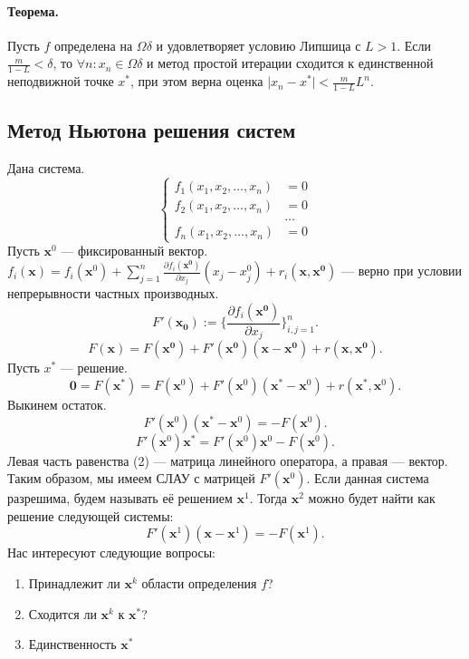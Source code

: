 \paragraph{Теорема.} Пусть $f$ определена на $\Omega\delta$ и удовлетворяет условию Липшица с $L > 1$. Если $\frac{m}{1-L} < \delta$, то $\forall n: x_n \in \Omega \delta$ и метод простой итерации сходится к единственной неподвижной точке $x^*$, при этом верна оценка $\vert x_n - x^*\vert < \frac {m}{1-L}L^n$.
\subsection{Метод Ньютона решения систем}
Дана система.
\[
	\left\{
	\begin{aligned}
		f_1(x_1, x_2, \dots, x_{n}) & = 0    \\
		f_2(x_1, x_2, \dots, x_{n}) & = 0    \\
		                            & \hdots \\
		f_n(x_1, x_2, \dots, x_{n}) & = 0    
	\end{aligned}
	\right.
\]
Пусть $\mathbf{x}^0$ --- фиксированный вектор. $f_i(\mathbf{x}) = f_i(\mathbf{x}^0) + \sum\limits_{j = 1}^{n} \frac{\partial f_i(\mathbf{x^0})}{\partial x_j}(x_j-x^0_j) + r_i(\mathbf{x}, \mathbf{x^0})$ --- верно при условии непрерывности частных производных.
\[
	F'(\mathbf{x_0}) := \{\frac{\partial f_i(\mathbf{x^0})}{\partial x_j}\}_{i, j = 1}^n.
\]
\[
	F(\mathbf{x}) = F(\mathbf{x^0}) + F'(\mathbf{x^0})(\mathbf{x} - \mathbf{x^0}) + r(\mathbf{x}, \mathbf{x^0}).
\]
Пусть $x^*$ --- решение.
\[
	\mathbf{0} = F(\mathbf{x}^*) = F(\mathbf{x}^0) + F'(\mathbf{x}^0)(\mathbf{x}^* - \mathbf{x}^0) + r(\mathbf{x}^*, \mathbf{x}^0).
\]
Выкинем остаток.
\[
	F'(\mathbf{x}^0)(\mathbf{x}^*-\mathbf{x}^0) = -F(\mathbf{x}^0).
\]
\begin{equation}
	F'(\mathbf{x}^0)\mathbf{x}^* = F'(\mathbf{x}^0)\mathbf{x}^0 - F(\mathbf{x}^0).
\end{equation}
Левая часть равенства (2) --- матрица линейного оператора, а правая --- вектор. Таким образом, мы имеем СЛАУ с матрицей $F'(\mathbf{x}^0)$. Если данная система разрешима, будем называть её решением $\mathbf{x}^1$. Тогда $\mathbf{x}^2$ можно будет найти как решение следующей системы:
\[
	F'(\mathbf{x}^1)(\mathbf{x}-\mathbf{x}^1) = -F(\mathbf{x}^1).
\]
Нас интересуют следующие вопросы:
\begin{enumerate}
	\item Принадлежит ли $\mathbf{x}^k$ области определения $f$?
	\item Сходится ли $\mathbf{x}^k$ к $\mathbf{x}^*$?
	\item Единственность $\mathbf{x}^*$
\end{enumerate}
